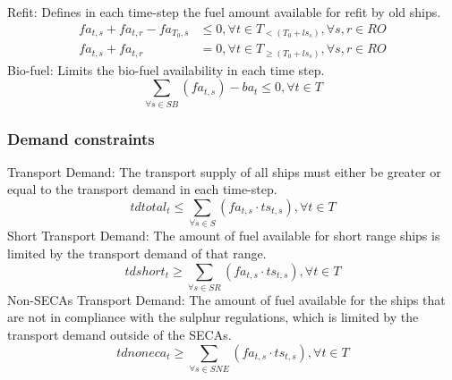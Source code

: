 \documentclass[article]{elsarticle}
\begin{document}
Refit: Defines in each time-step the fuel amount available for refit by old ships.
\begin{subequations}\label{eq:refitships}
    \begin{align}
    fa_{t,s} + fa_{t,r} - fa_{T_0, s} &\leq 0, \forall t \in T_{<\left(T_0+ls_{s}\right)}, \forall s, r \in RO\\
    fa_{t,s} + fa_{t,r} & = 0, \forall t \in T_{\geq\left(T_0+ls_{s}\right)}, \forall s, r \in RO
    \end{align}
\end{subequations}
Bio-fuel: Limits the bio-fuel availability in each time step.
\begin{equation}
    \sum_{\forall s \in SB} \left(fa_{t,s} \right) - ba_{t} \leq 0, \forall t \in T\label{eq:biofuel}
\end{equation}

\subsubsection{Demand constraints}
\noindent Transport Demand: The transport supply of all ships must either be greater or equal to the transport demand in each time-step.
\begin{equation}
    tdtotal_t \leq \sum_{\forall s \in S} \left( fa_{t,s} \cdot ts_{t,s}\right), \forall t \in T \label{eq:td_total}
\end{equation}
Short Transport Demand: The amount of fuel available for short range ships is limited by the transport demand of that range.
\begin{equation}
    tdshort_t \geq \sum_{\forall s \in SR} \left( fa_{t,s} \cdot ts_{t,s}\right), \forall t \in T \label{eq:td_short}
\end{equation}
Non-SECAs Transport Demand: The amount of fuel available for the ships that are not in compliance with the sulphur regulations, which is limited by the transport demand outside of the SECAs.
\begin{equation}
    tdnoneca_t \geq \sum_{\forall s \in SNE} \left( fa_{t,s} \cdot ts_{t,s}\right), \forall t \in T \label{eq:td_noneca}
\end{equation}
\end{document}
